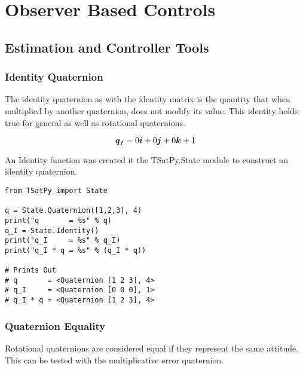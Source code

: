 
\chapter{Observer Based Controls}
\label{chap:ObserverBasedControls}

\section{Estimation and Controller Tools}
\label{sec:EstimationandControllerTools}

\subsection{Identity Quaternion}
\label{subsec:IdentityMultiplication}

The identity quaternion as with the identity matrix is the quantity that when multiplied by another quaternion, does not modify its value.  This identity holds true for general as well as rotational quaternions.

\begin{equation}
  \boldsymbol{q}_I = 0 \boldsymbol{i} + 0 \boldsymbol{j} + 0 \boldsymbol{k} + 1
\end{equation}

An Identity function was created it the TSatPy.State module to construct an identity quaternion.

\begin{singlespace}
  \begin{verbatim}
from TSatPy import State

q = State.Quaternion([1,2,3], 4)
print("q       = %s" % q)
q_I = State.Identity()
print("q_I     = %s" % q_I)
print("q_I * q = %s" % (q_I * q))

# Prints Out
# q       = <Quaternion [1 2 3], 4>
# q_I     = <Quaternion [0 0 0], 1>
# q_I * q = <Quaternion [1 2 3], 4>
  \end{verbatim}
  \nocite{minted}
\end{singlespace}


\subsection{Quaternion Equality}
\label{subsec:QuaterinonEquality}

Rotational quaternions are considered equal if they represent the same attitude.  This can be tested with the multiplicative error quaternion.

